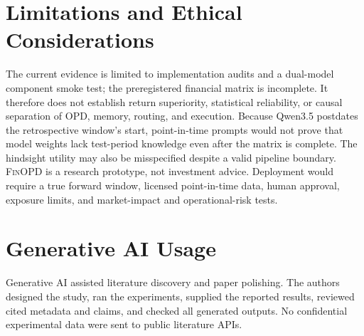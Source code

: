 \section*{Limitations and Ethical Considerations}

The current evidence is limited to implementation audits and a dual-model component smoke test; the preregistered financial matrix is incomplete. It therefore does not establish return superiority, statistical reliability, or causal separation of OPD, memory, routing, and execution. Because Qwen3.5 postdates the retrospective window's start, point-in-time prompts would not prove that model weights lack test-period knowledge even after the matrix is complete. The hindsight utility may also be misspecified despite a valid pipeline boundary. \textsc{FinOPD} is a research prototype, not investment advice. Deployment would require a true forward window, licensed point-in-time data, human approval, exposure limits, and market-impact and operational-risk tests.

\section*{Generative AI Usage}

Generative AI assisted literature discovery and paper polishing. The authors designed the study, ran the experiments, supplied the reported results, reviewed cited metadata and claims, and checked all generated outputs. No confidential experimental data were sent to public literature APIs.
